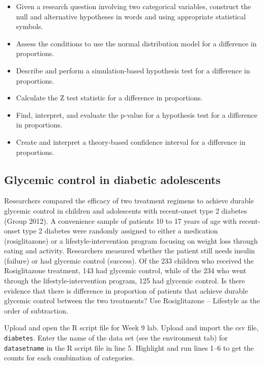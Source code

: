 \documentclass[
]{report}
\begin{document}
\begin{itemize}
\item
  Given a research question involving two categorical variables, construct the null and alternative hypotheses
  in words and using appropriate statistical symbols.
\item
  Assess the conditions to use the normal distribution model for a difference in proportions.
\item
  Describe and perform a simulation-based hypothesis test for a difference in proportions.
\item
  Calculate the Z test statistic for a difference in proportions.
\item
  Find, interpret, and evaluate the p-value for a hypothesis test for a difference in proportions.
\item
  Create and interpret a theory-based confidence interval for a difference in proportions.
\end{itemize}

\hypertarget{glycemic-control-in-diabetic-adolescents}{%
\subsection{Glycemic control in diabetic adolescents}\label{glycemic-control-in-diabetic-adolescents}}

Researchers compared the efficacy of two treatment regimens to achieve durable glycemic control in children and adolescents with recent-onset type 2 diabetes (Group 2012). A convenience sample of patients 10 to 17 years of age with recent-onset type 2 diabetes were randomly assigned to either a medication (rosiglitazone) or a lifestyle-intervention program focusing on weight loss through eating and activity. Researchers measured whether the patient still needs insulin (failure) or had glycemic control (success). Of the 233 children who received the Rosiglitazone treatment, 143 had glycemic control, while of the 234 who went through the lifestyle-intervention program, 125 had glycemic control. Is there evidence that there is difference in proportion of patients that achieve durable glycemic control between the two treatments? Use Rosiglitazone -- Lifestyle as the order of subtraction.

Upload and open the R script file for Week 9 lab. Upload and import the csv file, \texttt{diabetes}. Enter the name of the data set (see the environment tab) for \texttt{datasetname} in the R script file in line 5. Highlight and run lines 1--6 to get the counts for each combination of categories.
\end{document}
